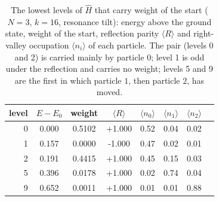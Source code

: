\begin{table}[ht]
\centering
\footnotesize
\caption{The lowest levels of $\hat H$ that carry weight of the start ($N=3$, $k=16$, resonance tilt): energy above the ground state, weight of the start, reflection parity $\langle R\rangle$ and right-valley occupation $\langle n_i\rangle$ of each particle. The pair (levels 0 and 2) is carried mainly by particle $0$; level 1 is odd under the reflection and carries no weight; levels 5 and 9 are the first in which particle $1$, then particle $2$, has moved.}
\label{tab:levels}
\begin{tabular}{rccccccc}
\toprule
level & $E-E_0$ & weight & $\langle R\rangle$ & $\langle n_0\rangle$ & $\langle n_1\rangle$ & $\langle n_2\rangle$ \\
\midrule
0 & 0.000 & 0.5102 & +1.000 & 0.52 & 0.04 & 0.02 \\
1 & 0.157 & 0.0000 & -1.000 & 0.47 & 0.02 & 0.01 \\
2 & 0.191 & 0.4415 & +1.000 & 0.45 & 0.15 & 0.03 \\
5 & 0.396 & 0.0178 & +1.000 & 0.02 & 0.74 & 0.04 \\
9 & 0.652 & 0.0011 & +1.000 & 0.01 & 0.01 & 0.88 \\
\bottomrule
\end{tabular}
\end{table}
